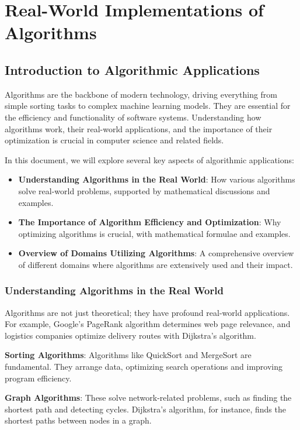 \documentclass[12pt]{book} %
\begin{document}
\chapter{Real-World Implementations of Algorithms}
\section{Introduction to Algorithmic Applications}
Algorithms are the backbone of modern technology, driving everything from simple sorting tasks to complex machine learning models. They are essential for the efficiency and functionality of software systems. Understanding how algorithms work, their real-world applications, and the importance of their optimization is crucial in computer science and related fields.

In this document, we will explore several key aspects of algorithmic applications:
\begin{itemize}
    \item \textbf{Understanding Algorithms in the Real World}: How various algorithms solve real-world problems, supported by mathematical discussions and examples.
    \item \textbf{The Importance of Algorithm Efficiency and Optimization}: Why optimizing algorithms is crucial, with mathematical formulae and examples.
    \item \textbf{Overview of Domains Utilizing Algorithms}: A comprehensive overview of different domains where algorithms are extensively used and their impact.
\end{itemize}

\subsection{Understanding Algorithms in the Real World}
Algorithms are not just theoretical; they have profound real-world applications. For example, Google’s PageRank algorithm determines web page relevance, and logistics companies optimize delivery routes with Dijkstra’s algorithm.

\textbf{Sorting Algorithms}: Algorithms like QuickSort and MergeSort are fundamental. They arrange data, optimizing search operations and improving program efficiency.

\textbf{Graph Algorithms}: These solve network-related problems, such as finding the shortest path and detecting cycles. Dijkstra's algorithm, for instance, finds the shortest paths between nodes in a graph.
\end{document}
